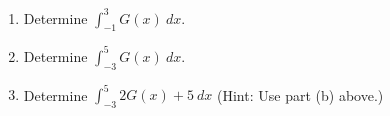 \documentclass[12pt]{article}
\renewcommand{\emph}[1]{\textsf{\textbf{#1}}}
\let\ds\displaystyle
\newcounter{probcount}
\newcounter{subprobcount}
\def\problem#1{\setcounter{subprobcount}{0}%
\addtocounter{probcount}{1}{\emph{\arabic{probcount}.\hskip 1em(#1)}}\par}
\newenvironment{subproblems}{%
\begin{enumerate}%
\setcounter{enumi}{\value{subprobcount}}%
\renewcommand{\theenumi}{\emph{\alph{enumi}}}}%
{\setcounter{subprobcount}{\value{enumi}}\end{enumerate}}
\begin{document}
	\begin{subproblems}
%	
%	
\item Determine $\ds \int_{-1}^3 G(x) \: dx$.

\vfill
	
\item Determine $\ds \int_{-3}^5 G(x) \: dx$.
	
\vfill

\item Determine $\ds \int_{-3}^5 2 G(x) + 5 \: dx$ (Hint: Use part (b) above.)
	\vfill
	\end{subproblems}



\newpage


%	
%
%	
%	
%	
\end{document}
